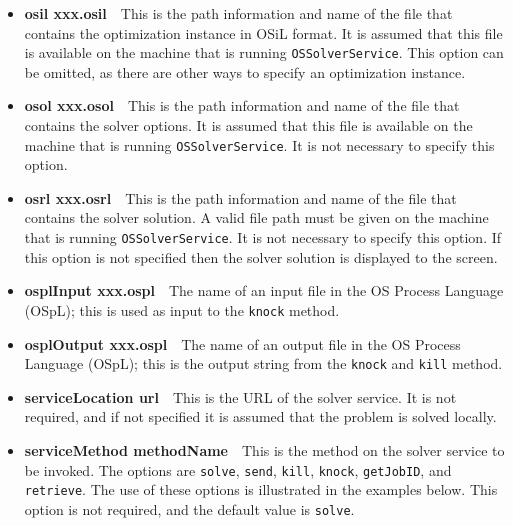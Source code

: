 \begin{itemize}


\item[] {\bf osil xxx.osil}\ \ This is the path information and name of
the file that contains the optimization instance in OSiL format.
It is assumed that this file is available on the machine that is running
{\tt OSSolverService}. This option can be omitted, as there are other ways
to specify an optimization instance.

\item[] {\bf osol xxx.osol}\ \ This is the path information and name of the file that contains the solver 
options. It is assumed that this file is available on the machine that is running {\tt OSSolverService}. 
It is not necessary to specify this option.

\item[] {\bf osrl xxx.osrl}\ \ This is the path information and name of the file that contains the solver 
solution. A valid file path must be given on the machine that is running {\tt OSSolverService}. 
It is not necessary to specify this option.
If this option is not specified then the solver solution is displayed to the screen.


\item[] {\bf osplInput xxx.ospl}\ \  The name of an input file in the  OS Process Language (OSpL); 
this is used as input  to the {\tt knock} method.

\item[] {\bf osplOutput xxx.ospl}\ \  The name of an output file in the  OS Process Language (OSpL); 
this is the  output  string from the {\tt knock}  and {\tt kill} method.

\item[] {\bf serviceLocation url}\ \ This is the URL of the solver service.
It is not required, and if not specified it is assumed that the problem
is solved locally.

\item[] {\bf serviceMethod  methodName}\ \ This is  the method on the solver service to be invoked.
The options are 
{\tt solve}, 
{\tt send},
{\tt kill}, 
{\tt knock},
{\tt getJobID}, and 
{\tt retrieve}.
The use of these options is illustrated in the examples below. This option is not required, and the default
value is {\tt solve}.


\end{itemize}
